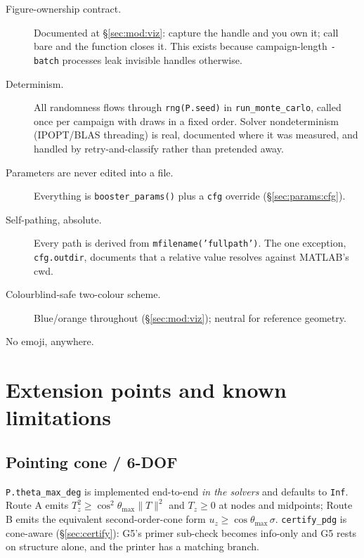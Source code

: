 \documentclass[11pt]{article}
\begin{document}
\begin{description}
\item[Figure-ownership contract.] Documented at \S\ref{sec:mod:viz}: capture
the handle and you own it; call bare and the function closes it. This exists
because campaign-length \texttt{-batch} processes leak invisible handles
otherwise.

\item[Determinism.] All randomness flows through
\texttt{rng(P.seed)} in \texttt{run\_monte\_carlo}, called once per campaign
with draws in a fixed order. Solver nondeterminism (IPOPT/BLAS threading) is
real, documented where it was measured, and handled by retry-and-classify
rather than pretended away.

\item[Parameters are never edited into a file.] Everything is
\texttt{booster\_params()} plus a \texttt{cfg} override
(\S\ref{sec:params:cfg}).

\item[Self-pathing, absolute.] Every path is derived from
\texttt{mfilename('fullpath')}. The one exception, \texttt{cfg.outdir},
documents that a relative value resolves against MATLAB's cwd.

\item[Colourblind-safe two-colour scheme.] Blue/orange throughout
(\S\ref{sec:mod:viz}); neutral for reference geometry.

\item[No emoji, anywhere.]

\end{description}

\section{Extension points and known limitations}
\label{sec:extend}

\subsection{Pointing cone / 6-DOF}
\label{sec:extend:cone}

\texttt{P.theta\_max\_deg} is implemented end-to-end \emph{in the solvers}
and defaults to \texttt{Inf}. Route A emits
$T_z^2 \ge \cos^2\theta_{\max}\lVert T\rVert^2$ and $T_z \ge 0$ at nodes and
midpoints; Route B emits the equivalent second-order-cone form
$u_z \ge \cos\theta_{\max}\,\sigma$. \texttt{certify\_pdg} is cone-aware
(\S\ref{sec:certify}): G5's primer sub-check becomes info-only and G5 rests
on structure alone, and the printer has a matching branch.
\end{document}
